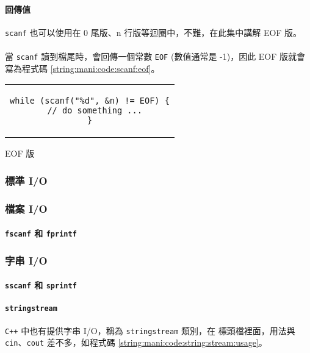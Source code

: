 \documentclass[12pt,a4paper,oneside]{article}
\begin{document}
\begin{CJK}{UTF8}{bkai}
\paragraph{回傳值}\lstinline!scanf! 也可以使用在 0 尾版、n 行版等迴圈中，不難，在此集中講解 EOF 版。
\paragraph{}當 \lstinline!scanf! 讀到檔尾時，會回傳一個常數 \lstinline!EOF! (數值通常是 -1)，因此 EOF 版就會寫為程式碼 \ref{string:mani:code:scanf:eof}。

\begin{code}[h!]
  \centering
  \begin{tabular}{c}
  \begin{lstlisting}
while (scanf("%d", &n) != EOF) {
  // do something ...
}
  \end{lstlisting}
  \end{tabular}
  \caption{EOF 版}
  \label{string:mani:code:scanf:eof}
\end{code}

\subsubsection{標準 I/O}

\subsubsection{檔案 I/O}
\paragraph{\lstinline!fscanf! 和 \lstinline!fprintf!}

\subsubsection{字串 I/O}

\paragraph{\lstinline!sscanf! 和 \lstinline!sprintf!}

\paragraph{\lstinline!stringstream!}\texttt{C++} 中也有提供字串 I/O，稱為 \lstinline!stringstream! 類別，在  標頭檔裡面，用法與 \lstinline!cin!、\lstinline!cout! 差不多，如程式碼 \ref{string:mani:code:string:stream:usage}。


\end{CJK}
\end{document}
